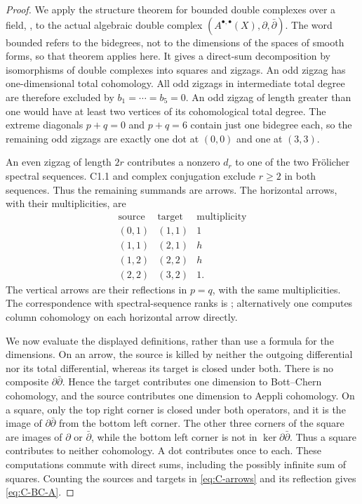 \begin{proof}
We apply the structure theorem for bounded double complexes over a
field, \citet[Theorem 3]{Stelzig2021}, to the actual algebraic double
complex $(A^{\bullet,\bullet}(X),\partial,\bar\partial)$.
The word bounded refers to the bidegrees, not to the dimensions of the
spaces of smooth forms, so that theorem applies here.  It gives a
direct-sum decomposition by isomorphisms of double complexes into
squares and zigzags.  An odd zigzag has one-dimensional total
cohomology.  All odd zigzags in intermediate total degree are therefore
excluded by $b_1=\cdots=b_5=0$.  An odd zigzag of length greater than
one would have at least two vertices of its cohomological total degree.
The extreme diagonals $p+q=0$ and $p+q=6$ contain just one bidegree
each, so the remaining odd zigzags are exactly one dot at $(0,0)$ and
one at $(3,3)$.

An even zigzag of length $2r$ contributes a nonzero $d_r$ to one of
the two Fr\"olicher spectral sequences.  C1.1 and complex conjugation
exclude $r\ge2$ in both sequences.  Thus the remaining summands are
arrows.  The horizontal arrows, with their multiplicities, are
\begin{equation}\label{eq:C-arrows}
\begin{array}{c|c|r}
\text{source}&\text{target}&\text{multiplicity}\\\hline
(0,1)&(1,1)&1\\
(1,1)&(2,1)&h\\
(1,2)&(2,2)&h\\
(2,2)&(3,2)&1.
\end{array}
\end{equation}
The vertical arrows are their reflections in $p=q$, with the same
multiplicities.  The correspondence with spectral-sequence ranks is
\citet[Proposition 6(1)]{Stelzig2021}; alternatively one computes
column cohomology on each horizontal arrow directly.

We now evaluate the displayed definitions, rather than use a formula
for the dimensions.  On an arrow, the source is killed by neither
the outgoing differential nor its total differential, whereas its
target is closed under both.  There is no composite
$\partial\bar\partial$.  Hence the target contributes one dimension
to Bott--Chern cohomology, and the source contributes one dimension
to Aeppli cohomology.  On a square, only the top right corner is closed
under both operators, and it is the image of
$\partial\bar\partial$ from the bottom left corner.  The other
three corners of the square are images of $\partial$ or
$\bar\partial$, while the bottom left corner is not in
$\ker\partial\bar\partial$.  Thus a square contributes to neither
cohomology.  A dot contributes once to each.  These computations
commute with direct sums, including the possibly infinite sum of
squares.  Counting the sources and targets in \eqref{eq:C-arrows}
and its reflection gives \eqref{eq:C-BC-A}.


\end{proof}
